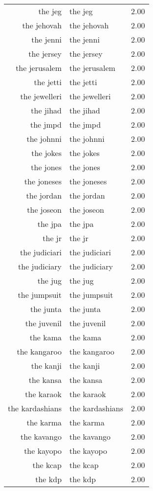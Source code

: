 \begin{table}[ht]
\begin{tabular}{rlr}
  the jeg & the jeg & 2.00 \\ 
  the jehovah & the jehovah & 2.00 \\ 
  the jenni & the jenni & 2.00 \\ 
  the jersey & the jersey & 2.00 \\ 
  the jerusalem & the jerusalem & 2.00 \\ 
  the jetti & the jetti & 2.00 \\ 
  the jewelleri & the jewelleri & 2.00 \\ 
  the jihad & the jihad & 2.00 \\ 
  the jmpd & the jmpd & 2.00 \\ 
  the johnni & the johnni & 2.00 \\ 
  the jokes & the jokes & 2.00 \\ 
  the jones & the jones & 2.00 \\ 
  the joneses & the joneses & 2.00 \\ 
  the jordan & the jordan & 2.00 \\ 
  the joseon & the joseon & 2.00 \\ 
  the jpa & the jpa & 2.00 \\ 
  the jr & the jr & 2.00 \\ 
  the judiciari & the judiciari & 2.00 \\ 
  the judiciary & the judiciary & 2.00 \\ 
  the jug & the jug & 2.00 \\ 
  the jumpsuit & the jumpsuit & 2.00 \\ 
  the junta & the junta & 2.00 \\ 
  the juvenil & the juvenil & 2.00 \\ 
  the kama & the kama & 2.00 \\ 
  the kangaroo & the kangaroo & 2.00 \\ 
  the kanji & the kanji & 2.00 \\ 
  the kansa & the kansa & 2.00 \\ 
  the karaok & the karaok & 2.00 \\ 
  the kardashians & the kardashians & 2.00 \\ 
  the karma & the karma & 2.00 \\ 
  the kavango & the kavango & 2.00 \\ 
  the kayopo & the kayopo & 2.00 \\ 
  the kcap & the kcap & 2.00 \\ 
  the kdp & the kdp & 2.00 \\ 

\end{tabular}
\end{table}
